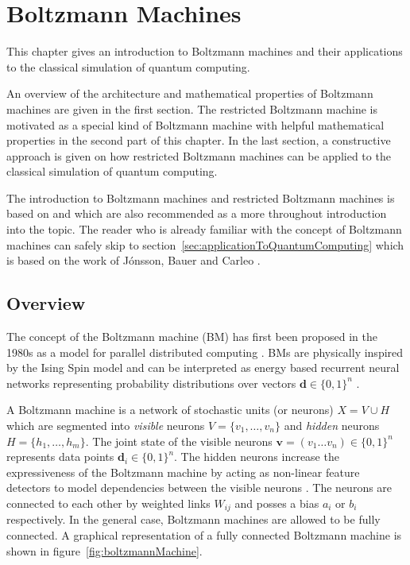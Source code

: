 \chapter{Boltzmann Machines}
This chapter gives an introduction to Boltzmann machines and their applications to the classical 
simulation of quantum computing.

An overview of the architecture and mathematical properties of Boltzmann machines are given in 
the first section. The restricted Boltzmann machine is motivated as a special kind of 
Boltzmann machine with helpful mathematical properties in the second part of this 
chapter. In the last section, a constructive approach is given on how restricted Boltzmann machines 
can be applied to the classical simulation of quantum computing.

The introduction to Boltzmann machines and restricted Boltzmann machines is based on \cite{montufar2018restricted} and 
\cite{fischer2012introduction} which are also recommended as a more throughout introduction into the topic. The 
reader who is already familiar with the concept of Boltzmann machines can safely skip
to section~\ref{sec:applicationToQuantumComputing} which is based on the work of J\'{o}nsson, Bauer and Carleo \cite{jnsson2018neuralnetwork}.

\section{Overview}
The concept of the Boltzmann machine (BM) has first been proposed in the 1980s as a
model for parallel distributed computing \cite{hinton1983analyzing}. BMs are physically inspired by the Ising Spin model 
and can be interpreted as energy based recurrent neural networks representing probability distributions
over vectors $\bm{d} \in \{0,1\}^n$ \cite{ackley1985learning}.

A Boltzmann machine is a network of stochastic units (or neurons) $X=V \cup H$ which are segmented into
\textit{visible} neurons $V=\{v_1, \dots, v_n\}$ and \textit{hidden} neurons $H=\{h_1, \dots, h_m\}$.
The joint state of the visible neurons $\bm{v} = (v_1\dots v_n) \in \{0,1\}^n$ represents data points $\bm{d}_i \in \{0,1\}^n$.
The hidden neurons increase the expressiveness of the Boltzmann machine by acting as non-linear feature 
detectors to model dependencies between the visible neurons \cite{hinton2010boltzmann}. The neurons are 
connected to each other by weighted links $W_{ij}$ and posses a bias $a_i$ or $b_i$ respectively. In the
general case, Boltzmann machines are allowed to be fully connected. A graphical 
representation of a fully connected Boltzmann machine is shown in figure~\ref{fig:boltzmannMachine}.

